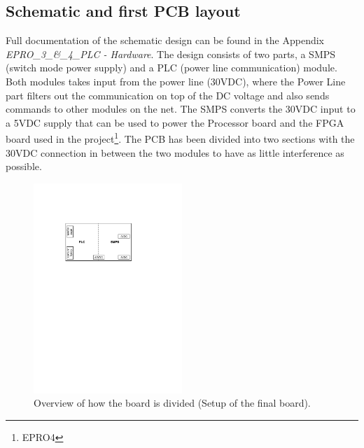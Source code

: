 \subsection{Schematic and first PCB layout}
Full documentation of the schematic design can be found in the Appendix \textit{EPRO\_3\_\&\_4\_PLC - Hardware}. The design consists of two parts, a SMPS (switch mode power supply) and a PLC (power line communication) module. Both modules takes input from the power line (30VDC), where the Power Line part filters out the communication on top of the DC voltage and also sends commands to other modules on the net. The SMPS converts the 30VDC input to a 5VDC supply that can be used to power the Processor board and the FPGA board used in the project\footnote{EPRO4}. The PCB has been divided into two sections with the 30VDC connection in between the two modules to have as little interference as possible.
\begin{figure}[H]
	\begin{centering}
		 \includegraphics[width=0.5\textwidth]{images/pcb_design.pdf}
		\caption{Overview of how the board is divided (Setup of the final board).}
		\label{fig:board_overview}
	\end{centering}
\end{figure}

